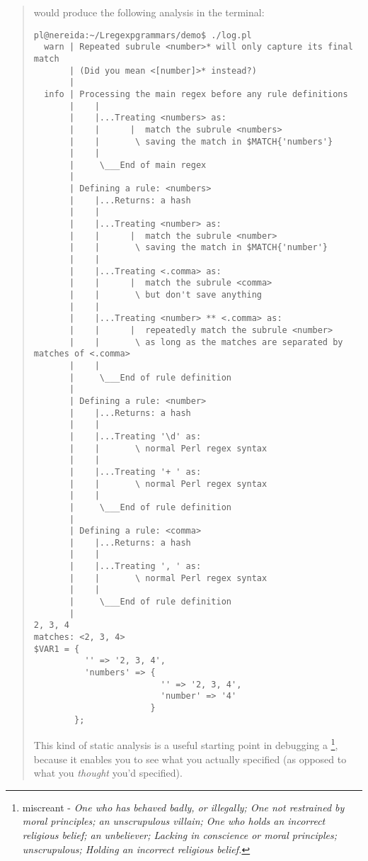 \begin{it}
\begin{quotation}
would produce the following analysis in the terminal:

\begin{verbatim}
pl@nereida:~/Lregexpgrammars/demo$ ./log.pl
  warn | Repeated subrule <number>* will only capture its final match
       | (Did you mean <[number]>* instead?)
       |
  info | Processing the main regex before any rule definitions
       |    |
       |    |...Treating <numbers> as:
       |    |      |  match the subrule <numbers>
       |    |       \ saving the match in $MATCH{'numbers'}
       |    |
       |     \___End of main regex
       |
       | Defining a rule: <numbers>
       |    |...Returns: a hash
       |    |
       |    |...Treating <number> as:
       |    |      |  match the subrule <number>
       |    |       \ saving the match in $MATCH{'number'}
       |    |
       |    |...Treating <.comma> as:
       |    |      |  match the subrule <comma>
       |    |       \ but don't save anything
       |    |
       |    |...Treating <number> ** <.comma> as:
       |    |      |  repeatedly match the subrule <number>
       |    |       \ as long as the matches are separated by matches of <.comma>
       |    |
       |     \___End of rule definition
       |
       | Defining a rule: <number>
       |    |...Returns: a hash
       |    |
       |    |...Treating '\d' as:
       |    |       \ normal Perl regex syntax
       |    |
       |    |...Treating '+ ' as:
       |    |       \ normal Perl regex syntax
       |    |
       |     \___End of rule definition
       |
       | Defining a rule: <comma>
       |    |...Returns: a hash
       |    |
       |    |...Treating ', ' as:
       |    |       \ normal Perl regex syntax
       |    |
       |     \___End of rule definition
       |
2, 3, 4
matches: <2, 3, 4>
$VAR1 = {
          '' => '2, 3, 4',
          'numbers' => {
                         '' => '2, 3, 4',
                         'number' => '4'
                       }
        };
\end{verbatim}

This kind of static analysis is a useful starting point in debugging a
\footnote{
miscreant - \it{One who has behaved badly, or illegally; One not restrained by
moral principles; an unscrupulous villain; One who holds an incorrect
religious belief; an unbeliever; Lacking in conscience or moral
principles; unscrupulous; Holding an incorrect religious belief.}
}, because it enables you to see what you actually
specified (as opposed to what you \emph{thought} you'd specified).


\end{quotation}
\end{it}
